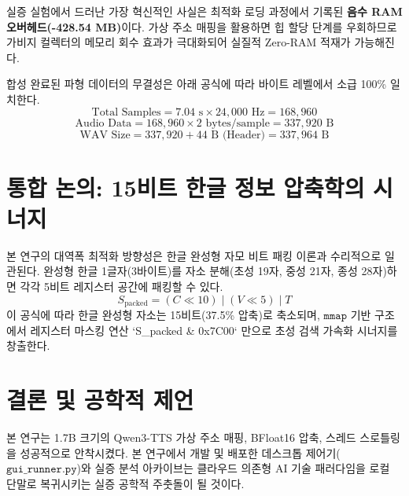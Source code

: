 \documentclass[twocolumn]{article}
\begin{document}
실증 실험에서 드러난 가장 혁신적인 사실은 최적화 로딩 과정에서 기록된 \textbf{음수 RAM 오버헤드(-428.54 MB)}이다. 가상 주소 매핑을 활용하면 힙 할당 단계를 우회하므로 가비지 컬렉터의 메모리 회수 효과가 극대화되어 실질적 Zero-RAM 적재가 가능해진다.

합성 완료된 파형 데이터의 무결성은 아래 공식에 따라 바이트 레벨에서 소급 100\% 일치한다.
\begin{equation}
\text{Total Samples} = 7.04 \text{ s} \times 24,000 \text{ Hz} = 168,960
\end{equation}
\begin{equation}
\text{Audio Data} = 168,960 \times 2 \text{ bytes/sample} = 337,920 \text{ B}
\end{equation}
\begin{equation}
\text{WAV Size} = 337,920 + 44 \text{ B (Header)} = 337,964 \text{ B}
\end{equation}

\section{통합 논의: 15비트 한글 정보 압축학의 시너지}
본 연구의 대역폭 최적화 방향성은 한글 완성형 자모 비트 패킹 이론과 수리적으로 일관된다. 완성형 한글 1글자(3바이트)를 자소 분해(초성 19자, 중성 21자, 종성 28자)하면 각각 5비트 레지스터 공간에 패킹할 수 있다.
\begin{equation}
S_{\text{packed}} = (C \ll 10) \mid (V \ll 5) \mid T
\end{equation}
이 공식에 따라 한글 완성형 자소는 15비트(37.5\% 압축)로 축소되며, $\mathtt{mmap}$ 기반 구조에서 레지스터 마스킹 연산 `S\_packed \& 0x7C00` 만으로 초성 검색 가속화 시너지를 창출한다.

\section{결론 및 공학적 제언}
본 연구는 1.7B 크기의 Qwen3-TTS 가상 주소 매핑, BFloat16 압축, 스레드 스로틀링을 성공적으로 안착시켰다. 본 연구에서 개발 및 배포한 데스크톱 제어기($\mathtt{gui\_runner.py}$)와 실증 분석 아카이브는 클라우드 의존형 AI 기술 패러다임을 로컬 단말로 복귀시키는 실증 공학적 주춧돌이 될 것이다.
\end{document}
